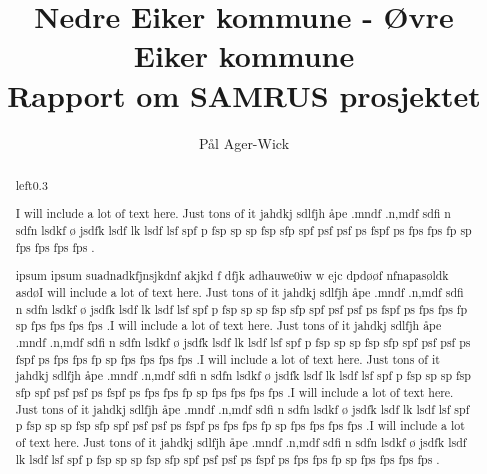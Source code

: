 \documentclass[11pt]{article} %
\title{Nedre Eiker kommune - Øvre Eiker kommune \\ Rapport om SAMRUS prosjektet}
\author{Pål Ager-Wick}
\newcommand{\overskriften}[1]{\par\noindent\colorbox{headingcolor}
  {\parbox{\dimexpr\textwidth-2\fboxsep\relax}{#1}}}
\begin{document}


              \renewcommand{\abstractname}{\overskriften{\textsf{\Huge{Prosjektbeskrivelse}}}}



             \begin{abstract}%
           	  	
           	  	
           	  	\begin{wrapfigure}{left}{0.3\textwidth}
  \begin{center}
   I will include a lot of text here. Just tons of it jahdkj sdlfjh åpe .mndf .n,mdf sdfi n sdfn  lsdkf ø jsdfk lsdf lk lsdf lsf spf p fsp sp sp fsp sfp spf psf psf ps fspf ps fps fps fp sp fps fps fps fps .
  \end{center}
			\end{wrapfigure}
			
  				
         ipsum ipsum suadnadkfjnsjkdnf akjkd f dfjk adhauwe0iw w ejc dpdøøf nfnapasøldk asdøI will include a lot of text here. Just tons of it jahdkj sdlfjh åpe .mndf .n,mdf sdfi n sdfn  lsdkf ø jsdfk lsdf lk lsdf lsf spf p fsp sp sp fsp sfp spf psf psf ps fspf ps fps fps fp sp fps fps fps fps .I will include a lot of text here. Just tons of it jahdkj sdlfjh åpe .mndf .n,mdf sdfi n sdfn  lsdkf ø jsdfk lsdf lk lsdf lsf spf p fsp sp sp fsp sfp spf psf psf ps fspf ps fps fps fp sp fps fps fps fps .I will include a lot of text here. Just tons of it jahdkj sdlfjh åpe .mndf .n,mdf sdfi n sdfn  lsdkf ø jsdfk lsdf lk lsdf lsf spf p fsp sp sp fsp sfp spf psf psf ps fspf ps fps fps fp sp fps fps fps fps .I will include a lot of text here. Just tons of it jahdkj sdlfjh åpe .mndf .n,mdf sdfi n sdfn  lsdkf ø jsdfk lsdf lk lsdf lsf spf p fsp sp sp fsp sfp spf psf psf ps fspf ps fps fps fp sp fps fps fps fps .I will include a lot of text here. Just tons of it jahdkj sdlfjh åpe .mndf .n,mdf sdfi n sdfn  lsdkf ø jsdfk lsdf lk lsdf lsf spf p fsp sp sp fsp sfp spf psf psf ps fspf ps fps fps fp sp fps fps fps fps .

              \end{abstract}
\end{document}
